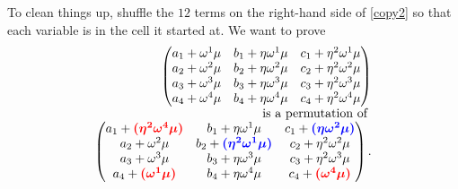 \documentclass{article}
\newcommand{\redoval}[1]{\textcolor{red}{\boldsymbol{#1}}}
\newcommand{\bluerect}[1]{\textcolor{blue}{\boldsymbol{#1}}}
\begin{document}
To clean things up, shuffle the \(12\) terms on the right-hand side of
\hyperref[copy2]{{[}copy2{]}} so that each variable is in the cell it
started at. We want to prove \[\begin{array}{r}
\begin{pmatrix}
a_{1} + \omega^{1}\mu & b_{1} + \eta\omega^{1}\mu & c_{1} + \eta^{2}\omega^{1}\mu \\
a_{2} + \omega^{2}\mu & b_{2} + \eta\omega^{2}\mu & c_{2} + \eta^{2}\omega^{2}\mu \\
a_{3} + \omega^{3}\mu & b_{3} + \eta\omega^{3}\mu & c_{3} + \eta^{2}\omega^{3}\mu \\
a_{4} + \omega^{4}\mu & b_{4} + \eta\omega^{4}\mu & c_{4} + \eta^{2}\omega^{4}\mu
\end{pmatrix} \\
\text{is a permutation of } \\
\begin{pmatrix}
a_{1} + \redoval{({\eta^{2}\omega^{4}\mu})} & b_{1} + \eta\omega^{1}\mu & c_{1} + \bluerect{({\eta\omega^{2}\mu})} \\
a_{2} + \omega^{2}\mu & b_{2} + \bluerect{({\eta^{2}\omega^{1}\mu})} & c_{2} + \eta^{2}\omega^{2}\mu \\
a_{3} + \omega^{3}\mu & b_{3} + \eta\omega^{3}\mu & c_{3} + \eta^{2}\omega^{3}\mu \\
a_{4} + \redoval{({\omega^{1}\mu})} & b_{4} + \eta\omega^{4}\mu & c_{4} + \redoval{({\omega^{4}\mu})}
\end{pmatrix}.
\end{array}\] \label{copy3}{}
\end{document}
